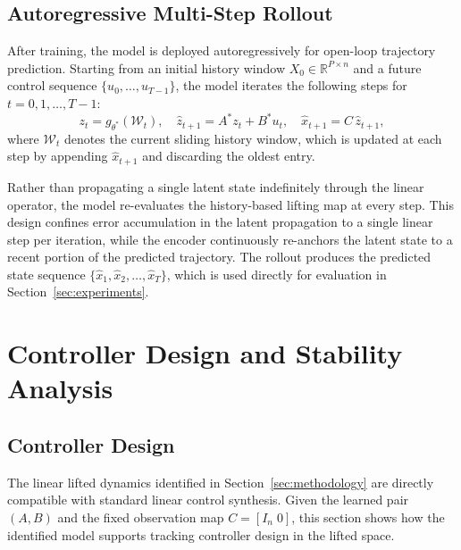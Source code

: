 \documentclass[journal]{IEEEtran}
\begin{document}
\subsection{Autoregressive Multi-Step Rollout}
\label{sec:rollout}

After training, the model is deployed autoregressively for open-loop trajectory prediction. Starting from an initial history window $X_0 \in \mathbb{R}^{P \times n}$ and a future control sequence $\{u_0,\ldots,u_{T-1}\}$, the model iterates the following steps for $t=0,1,\ldots,T-1$:
\begin{equation}
    z_t = g_{\theta^*}(\mathcal{W}_t), \quad
    \hat{z}_{t+1} = A^* z_t + B^* u_t, \quad
    \hat{x}_{t+1} = C\,\hat{z}_{t+1},
    \label{eq:rollout_step}
\end{equation}
where $\mathcal{W}_t$ denotes the current sliding history window, which is updated at each step by appending $\hat{x}_{t+1}$ and discarding the oldest entry.

Rather than propagating a single latent state indefinitely through the linear operator, the model re-evaluates the history-based lifting map at every step. This design confines error accumulation in the latent propagation to a single linear step per iteration, while the encoder continuously re-anchors the latent state to a recent portion of the predicted trajectory. The rollout produces the predicted state sequence $\{\hat{x}_1,\hat{x}_2,\ldots,\hat{x}_T\}$, which is used directly for evaluation in Section~\ref{sec:experiments}.

\section{Controller Design and Stability Analysis}
\label{sec:control}

\subsection{Controller Design}
\label{subsec:controller_design}

The linear lifted dynamics identified in Section~\ref{sec:methodology} are directly compatible with standard linear control synthesis. Given the learned pair $(A, B)$ and the fixed observation map $C = [I_n\;0]$, this section shows how the identified model supports tracking controller design in the lifted space.
\end{document}
